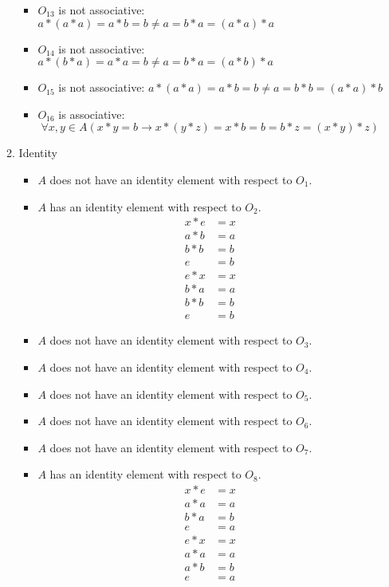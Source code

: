 \begin{enumerate}[label={\Alph*.},font={\bfseries}]
\begin{enumerate}[label={\arabic*},font={\bfseries}]
\begin{itemize}
    \item $O_{13}$ is not associative: $a*(a*a)=a*b=b \neq a=b*a=(a*a)*a$
    \item $O_{14}$ is not associative: $a*(b*a)=a*a=b \neq a=b*a=(a*b)*a$
    \item $O_{15}$ is not associative: $a*(a*a)=a*b=b \neq a=b*b=(a*a)*b$
    \item $O_{16}$ is associative:
      $$\forall x,y \in A (x*y=b \to x*(y*z)=x*b=b=b*z=(x*y)*z)$$
    \end{itemize}
  \item Identity
    \begin{itemize}
    \item $A$ does not have an identity element with respect to $O_1$.
    \item $A$ has an identity element with respect to $O_2$.
      \begin{align*}
        x*e &= x \\
        a*b &= a \\
        b*b &= b \\
        e &= b \\
        e*x &= x \\
        b*a &= a \\
        b*b &= b \\
        e &= b
      \end{align*}
    \item $A$ does not have an identity element with respect to $O_3$.
    \item $A$ does not have an identity element with respect to $O_4$.
    \item $A$ does not have an identity element with respect to $O_5$.
    \item $A$ does not have an identity element with respect to $O_6$.
    \item $A$ does not have an identity element with respect to $O_7$.
    \item $A$ has an identity element with respect to $O_8$.
      \begin{align*}
        x*e &= x \\
        a*a &= a \\
        b*a &= b \\
        e &= a \\
        e*x &= x \\
        a*a &= a \\
        a*b &= b \\
        e &= a
      \end{align*}

\end{itemize}
\end{enumerate}
\end{enumerate}
